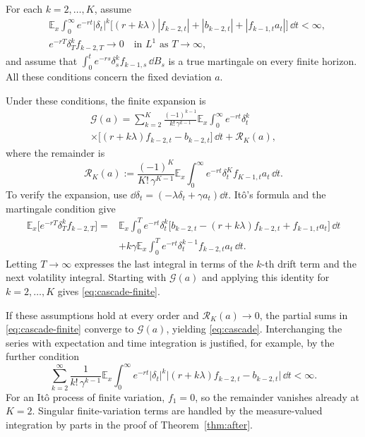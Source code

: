 \documentclass[12pt]{article}
\newcommand{\E}{\mathbb{E}}
\begin{document}
For each \(k=2,\ldots,K\), assume
\begin{align}
  &\E_x\int_0^\infty e^{-rt}|\delta_t|^k
    \bigl[(r+k\lambda)|f_{k-2,t}|+|b_{k-2,t}|
           +|f_{k-1,t}a_t|\bigr]\,\dd t<\infty,
     \label{eq:cascade-integrability}\\
  &e^{-rT}\delta_T^k f_{k-2,T}\longrightarrow0
       \quad\text{in }L^1\text{ as }T\to\infty,
     \label{eq:cascade-terminal}
\end{align}
and assume that
\(\int_0^t e^{-rs}\delta_s^k f_{k-1,s}\,\dd B_s\)
is a true martingale on every finite horizon. All these conditions
concern the fixed deviation \(a\).

Under these conditions, the finite expansion is
\begin{multline}\label{eq:cascade-finite}
  \mathcal G(a)
  =\sum_{k=2}^{K}\frac{(-1)^{k-1}}{k!\,\gamma^{k-1}}
    \E_x\int_0^\infty e^{-rt}\delta_t^k\\
    \times\bigl[(r+k\lambda)f_{k-2,t}-b_{k-2,t}\bigr]\,\dd t
    +\mathcal R_K(a),
\end{multline}
where the remainder is
\begin{equation}\label{eq:cascade-remainder}
  \mathcal R_K(a)
  :=\frac{(-1)^K}{K!\,\gamma^{K-1}}
    \E_x\int_0^\infty e^{-rt}
      \delta_t^K f_{K-1,t}a_t\,\dd t.
\end{equation}
To verify the expansion, use
\(\dd\delta_t=(-\lambda\delta_t+\gamma a_t)\dd t\).
It\^o's formula and the martingale condition give
\begin{align*}
  \E_x\bigl[e^{-rT}\delta_T^k f_{k-2,T}\bigr]
  ={}&\E_x\int_0^T e^{-rt}\delta_t^k
     \bigl[b_{k-2,t}-(r+k\lambda)f_{k-2,t}
            +f_{k-1,t}a_t\bigr]\,\dd t\\
     &+k\gamma\E_x\int_0^T e^{-rt}
          \delta_t^{k-1}f_{k-2,t}a_t\,\dd t.
\end{align*}
Letting \(T\to\infty\) expresses the last integral in terms of
the \(k\)-th drift term and the next volatility integral. Starting
with \(\mathcal G(a)\) and applying this identity for
\(k=2,\ldots,K\) gives \eqref{eq:cascade-finite}.

If these assumptions hold at every order and
\(\mathcal R_K(a)\to0\), the partial sums in
\eqref{eq:cascade-finite} converge to \(\mathcal G(a)\), yielding
\eqref{eq:cascade}. Interchanging the series with expectation and
time integration is justified, for example, by the further condition
\begin{equation}\label{eq:cascade-absolute-sum}
  \sum_{k=2}^\infty\frac{1}{k!\,\gamma^{k-1}}
    \E_x\int_0^\infty e^{-rt}|\delta_t|^k
       \bigl|(r+k\lambda)f_{k-2,t}-b_{k-2,t}\bigr|
       \,\dd t<\infty.
\end{equation}
For an It\^o process of finite variation, \(f_1=0\), so the
remainder vanishes already at \(K=2\). Singular finite-variation
terms are handled by the measure-valued integration by parts in
the proof of Theorem~\ref{thm:after}.
\end{document}
